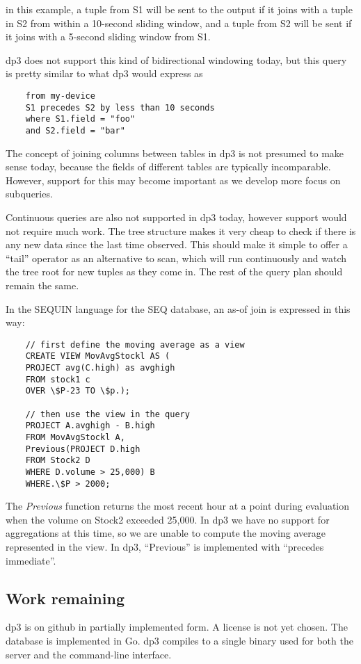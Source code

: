 \documentclass[9pt,twocolumn]{article}
\newcommand{\q}[1]{``#1''}
\begin{document}
    in this example, a tuple from S1 will be sent to the output if it joins with
    a tuple in S2 from within a 10-second sliding window, and a tuple from S2 will
    be sent if it joins with a 5-second sliding window from S1.

    dp3 does not support this kind of bidirectional windowing today, but this
    query is pretty similar to what dp3 would express as

    \begin{lstlisting}
    from my-device
    S1 precedes S2 by less than 10 seconds
    where S1.field = "foo"
    and S2.field = "bar"
    \end{lstlisting}

    The concept of joining columns between tables in dp3 is not presumed to make
    sense today, because the fields of different tables are typically
    incomparable. However, support for this may become important as we develop
    more focus on subqueries.

    Continuous queries are also not supported in dp3 today, however support
    would not require much work. The tree structure makes it very cheap to
    check if there is any new data since the last time observed. This should
    make it simple to offer a \q{tail} operator as an alternative to scan,
    which will run continuously and watch the tree root for new tuples as they
    come in. The rest of the query plan should remain the same.

    In the SEQUIN language for the SEQ database, an as-of join is expressed in
    this way:

    \begin{lstlisting}
    // first define the moving average as a view
    CREATE VIEW MovAvgStockl AS (
    PROJECT avg(C.high) as avghigh
    FROM stock1 c
    OVER \$P-23 TO \$p.);

    // then use the view in the query
    PROJECT A.avghigh - B.high
    FROM MovAvgStockl A,
    Previous(PROJECT D.high
    FROM Stock2 D
    WHERE D.volume > 25,000) B
    WHERE.\$P > 2000;
    \end{lstlisting}

    The \textit{Previous} function returns the most recent hour at a point during
    evaluation when the volume on Stock2 exceeded 25,000. In dp3 we have no support
    for aggregations at this time, so we are unable to compute the moving average
    represented in the view. In dp3, \q{Previous} is implemented with \q{precedes
    immediate}.

    \subsection{Work remaining}
    dp3 is on github \cite{dp3} in partially implemented form. A license is not
    yet chosen. The database is implemented in Go. dp3 compiles to a single
    binary used for both the server and the command-line interface.
\end{document}
